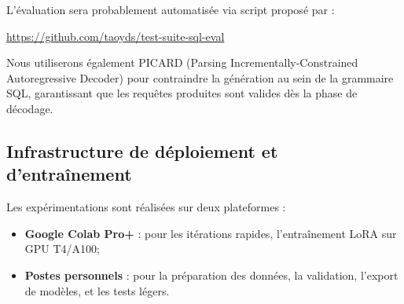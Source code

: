 \documentclass[12pt]{article}
\begin{document}
L’évaluation sera probablement automatisée via script proposé par \cite{yu2019spider} :
\begin{center}
\url{https://github.com/taoyds/test-suite-sql-eval}
\end{center}

Nous utiliserons également PICARD (Parsing Incrementally-Constrained Autoregressive Decoder) pour contraindre la génération au sein de la grammaire SQL, garantissant que les requêtes produites sont valides dès la phase de décodage.

\subsection{Infrastructure de déploiement et d'entraînement}
Les expérimentations sont réalisées sur deux plateformes :
\begin{itemize}
  \item \textbf{Google Colab Pro+} : pour les itérations rapides, l’entraînement LoRA sur GPU T4/A100;
  \item \textbf{Postes personnels} : pour la préparation des données, la validation, l’export de modèles, et les tests légers.
\end{itemize}

\clearpage\newpage
\end{document}
